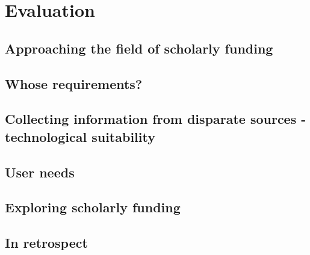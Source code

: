 \chapter{Evaluation}




\section{Approaching the field of scholarly funding}


\section{Whose requirements?}

\section{Collecting information from disparate sources - technological suitability}

\section{User needs}

\section{Exploring scholarly funding}

\section{In retrospect}
